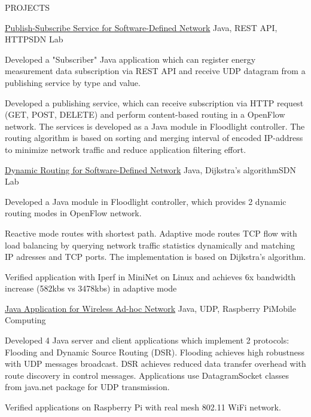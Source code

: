 \documentclass{resume} %
\begin{document}
\begin{rSection}{PROJECTS}
\begin{rSubsection}{\href{https://github.com/kuangyu0801/software-defined-networking-ws20/tree/main/sdn-assign-04}{Publish-Subscribe Service for Software-Defined Network}} { Java, REST API, HTTP}{SDN Lab}{}
\item Developed a "Subscriber" Java application which can register energy measurement data subscription via REST API and receive UDP datagram from a publishing service by type and value.
\item Developed a publishing service, which can receive subscription via HTTP request (GET, POST,  DELETE) and perform content-based routing in a OpenFlow network. The services is developed as a Java module in Floodlight controller. The routing algorithm is based on sorting and merging interval of encoded IP-address to minimize network traffic and reduce application filtering effort.
\end{rSubsection}

\begin{rSubsection}{\href{https://github.com/kuangyu0801/software-defined-networking-ws20/tree/main/sdn-assign-03}{Dynamic Routing for Software-Defined Network}} {Java, Dijkstra's algorithm}{SDN Lab}{}
\item Developed a Java module in Floodlight controller, which provides 2 dynamic routing modes in OpenFlow network. 
\item Reactive mode routes with shortest path. Adaptive mode routes TCP flow with load balancing by querying network traffic statistics dynamically and matching IP adresses and TCP ports. The implementation is based on Dijkstra's algorithm.
\item Verified application with Iperf in MiniNet on Linux and achieves 6x bandwidth increase (582kbs vs 3478kbs) in adaptive mode
\end{rSubsection}

\begin{rSubsection}{\href{https://github.com/kuangyu0801/MobileComputing_SS20_assign04}{Java Application for Wireless Ad-hoc Network}} {Java, UDP, Raspberry Pi}{Mobile Computing}{}
\item Developed 4 Java server and client applications which implement 2 protocols: Flooding and Dynamic Source Routing (DSR). Flooding achieves high robustness with UDP messages broadcast. DSR achieves reduced data transfer overhead with route discovery in control messages. Applications use DatagramSocket classes from java.net package for UDP transmission.
\item Verified applications on Raspberry Pi with real mesh 802.11 WiFi network. 


\end{rSubsection}
\end{rSection}
\end{document}
